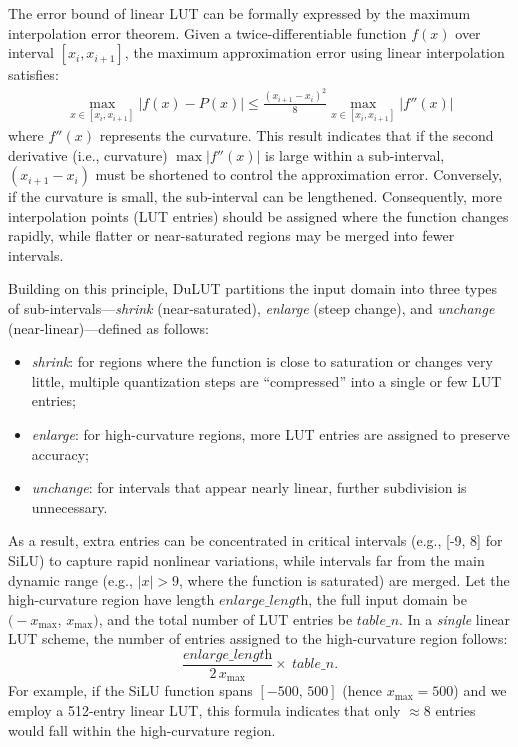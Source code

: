 The error bound of linear LUT can be formally expressed by the maximum interpolation error theorem. Given a twice-differentiable function $f(x)$ over interval $[x_i, x_{i+1}]$, the maximum approximation error using linear interpolation satisfies:
\vspace{-3mm}
\begin{equation}
\begin{aligned}
\max_{x\in[x_i,x_{i+1}]} |f(x)-P(x)| \leq \frac{(x_{i+1}-x_i)^2}{8} \max_{x\in[x_i,x_{i+1}]} |f''(x)|
\label{eq:error_bound}
\end{aligned}
\end{equation}
where $f''(x)$ represents the curvature. This result indicates that if the second derivative (i.e., curvature) $\max \lvert f''(x) \rvert$ is large within a sub-interval, $(x_{i+1} - x_i)$ must be shortened to control the approximation error. Conversely, if the curvature is small, the sub-interval can be lengthened. Consequently, more interpolation points (LUT entries) should be assigned where the function changes rapidly, while flatter or near-saturated regions may be merged into fewer intervals.

Building on this principle, DuLUT partitions the input domain into three types of sub-intervals—\textit{shrink} (near-saturated), \textit{enlarge} (steep change), and \textit{unchange} (near-linear)—defined as follows:
\begin{itemize}
\item \textit{shrink}: for regions where the function is close to saturation or changes very little, multiple quantization steps are “compressed” into a single or few LUT entries;
\item \textit{enlarge}: for high-curvature regions, more LUT entries are assigned to preserve accuracy;
\item \textit{unchange}: for intervals that appear nearly linear, further subdivision is unnecessary.
\end{itemize}

As a result, extra entries can be concentrated in critical intervals (e.g., [-9, 8] for SiLU) to capture rapid nonlinear variations, while intervals far from the main dynamic range (e.g., $\lvert x\rvert > 9$, where the function is saturated) are merged. Let the high-curvature region have length \(\textit{enlarge\_length}\), the full input domain be \(\bigl(-x_{\max},\, x_{\max}\bigr)\), and the total number of LUT entries be \(\textit{table\_n}\). In a \emph{single} linear LUT scheme, the number of entries assigned to the high-curvature region follows:
\begin{equation}
    \frac{\textit{enlarge\_length}}{2\,x_{\max}} \times\ \textit{table\_n}.
\end{equation}
For example, if the SiLU function spans \([-500,\,500]\) (hence \(x_{\max} = 500\)) and we employ a 512-entry linear LUT, this formula indicates that only \(\approx 8\) entries would fall within the high-curvature region.

